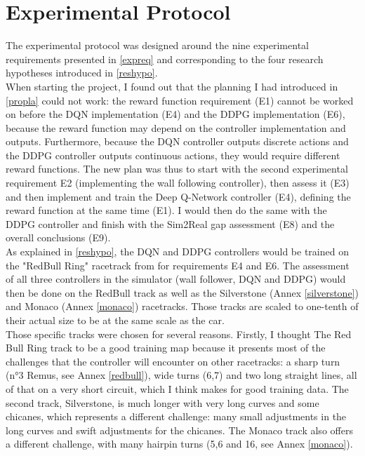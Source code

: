 
\chapter{Experimental Protocol} %

\label{Chapter6} %



The experimental protocol was designed around the nine experimental requirements presented in \ref{expreq} and corresponding to the four research hypotheses introduced in \ref{reshypo}. \\
When starting the project, I found out that the planning I had introduced in \ref{propla} could not work: the reward function requirement (E1) cannot be worked on before the DQN implementation (E4) and the DDPG implementation (E6), because the reward function may depend on the controller implementation and outputs. Furthermore, because the DQN controller outputs discrete actions and the DDPG controller outputs continuous actions, they would require different reward functions. The new plan was thus to start with the second experimental requirement E2 (implementing the wall following controller), then assess it (E3) and then implement and train the Deep Q-Network controller (E4), defining the reward function at the same time (E1). I would then do the same with the DDPG controller and finish with the Sim2Real gap assessment (E8) and the overall conclusions (E9). \\
As explained in \ref{reshypo}, the DQN and DDPG controllers would be trained on the "RedBull Ring" racetrack from \cite{bosello} for requirements E4 and E6. The assessment of all three controllers in the simulator (wall follower, DQN and DDPG) would then be done on the RedBull track as well as the Silverstone (Annex \ref{silverstone}) and Monaco (Annex \ref{monaco}) racetracks. Those tracks are scaled to one-tenth of their actual size to be at the same scale as the car. \\
Those specific tracks were chosen for several reasons. Firstly, I thought The Red Bull Ring track to be a good training map because it presents most of the challenges that the controller will encounter on other racetracks: a sharp turn (n°3 Remus, see Annex \ref{redbull}), wide turns (6,7) and two long straight lines, all of that on a very short circuit, which I think makes for good training data. The second track, Silverstone, is much longer with very long curves and some chicanes, which represents a different challenge: many small adjustments in the long curves and swift adjustments for the chicanes. The Monaco track also offers a different challenge, with many hairpin turns (5,6 and 16, see Annex \ref{monaco}). \\
